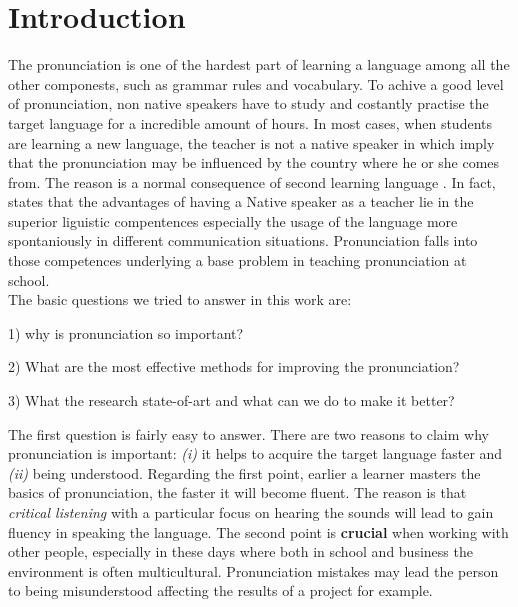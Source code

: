 \chapter{Introduction}
The pronunciation is one of the hardest part of learning a language among all the other componests, such as grammar rules and vocabulary. To achive a good level of pronunciation, non native speakers have to study and costantly practise the target language for a incredible amount of hours. In most cases, when students are learning a new language, the teacher is not a native speaker in which imply that the pronunciation may be influenced by the country where he or she comes from. The reason is a normal consequence of second learning language \cite{derwing2005second}. In fact, \cite{medgyes2001teacher} states that the advantages of having a Native speaker as a teacher lie in the superior liguistic compentences especially the usage of the language more spontaniously in different communication situations. Pronunciation falls into those competences underlying a base problem in teaching pronunciation at school.  \\

\noindent The basic questions we tried to answer in this work are:
\begin{compactitem}
    \item[1)] why is pronunciation so important?
    \item[2)] What are the most effective methods for improving the pronunciation?
    \item[3)] What the research state-of-art and what can we do to make it better?
\end{compactitem}

\vspace*{1em}

\noindent The first question is fairly easy to answer. There are two reasons to claim why pronunciation is important: \textit{(i)} it helps to acquire the target language faster and \textit{(ii)} being understood.
Regarding the first point, earlier a learner masters the basics of pronunciation, the faster it will become fluent. The reason is that \textit{critical listening} with a particular focus on hearing the sounds will lead to gain fluency in speaking the language.
The second point is \textbf{crucial} when working with other people, especially in these days where both in school and business the environment is often multicultural. Pronunciation mistakes may lead the person to being misunderstood affecting the results of a project for example. \\

